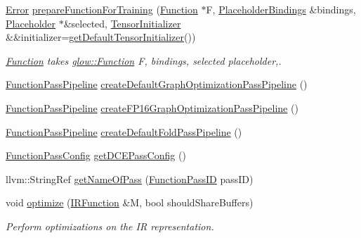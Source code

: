 \begin{DoxyCompactItemize}
\mbox{\label{namespaceglow_afab8032d084eac6febc76e522aec8564}} 
\hyperlink{namespaceglow_afdb176c3a672ef66db0ecfc19a8d39bf}{Error} \hyperlink{namespaceglow_afab8032d084eac6febc76e522aec8564}{prepare\+Function\+For\+Training} (\hyperlink{classglow_1_1_function}{Function} $\ast$F, \hyperlink{classglow_1_1_placeholder_bindings}{Placeholder\+Bindings} \&bindings, \hyperlink{classglow_1_1_placeholder}{Placeholder} $\ast$\&selected, \hyperlink{namespaceglow_a32fc0e338408955f80a23cc7e0c0c82e}{Tensor\+Initializer} \&\&initializer=\hyperlink{namespaceglow_a4919335ab33be32c994fc590a146f819}{get\+Default\+Tensor\+Initializer}())
\begin{DoxyCompactList}\small\item\em \hyperlink{classglow_1_1_function}{Function} takes \hyperlink{classglow_1_1_function}{glow\+::\+Function} {\ttfamily F}, {\ttfamily bindings}, {\ttfamily selected} placeholder,. \end{DoxyCompactList}\item 
\hyperlink{classglow_1_1_function_pass_pipeline}{Function\+Pass\+Pipeline} \hyperlink{namespaceglow_afd7544cbea4219b8f3c720d6a4e19481}{create\+Default\+Graph\+Optimization\+Pass\+Pipeline} ()
\item 
\hyperlink{classglow_1_1_function_pass_pipeline}{Function\+Pass\+Pipeline} \hyperlink{namespaceglow_a2cba8b151906d972e63ced04b7e02242}{create\+F\+P16\+Graph\+Optimization\+Pass\+Pipeline} ()
\item 
\hyperlink{classglow_1_1_function_pass_pipeline}{Function\+Pass\+Pipeline} \hyperlink{namespaceglow_a9e0b594543fb42b8b6ad0cc556ee9829}{create\+Default\+Fold\+Pass\+Pipeline} ()
\item 
\hyperlink{classglow_1_1_function_pass_config}{Function\+Pass\+Config} \hyperlink{namespaceglow_a4fef74193703ceb204297b6993af8081}{get\+D\+C\+E\+Pass\+Config} ()
\item 
llvm\+::\+String\+Ref \hyperlink{namespaceglow_a6195ce22fbeafd894c0ce148bb7a8a9a}{get\+Name\+Of\+Pass} (\hyperlink{namespaceglow_a3157945b92abd634c79fa9d4724472eb}{Function\+Pass\+ID} pass\+ID)
\item 
\mbox{\label{namespaceglow_ac26012881301f2ecb24de4db2c87acf1}} 
void \hyperlink{namespaceglow_ac26012881301f2ecb24de4db2c87acf1}{optimize} (\hyperlink{classglow_1_1_i_r_function}{I\+R\+Function} \&M, bool should\+Share\+Buffers)
\begin{DoxyCompactList}\small\item\em Perform optimizations on the IR representation. \end{DoxyCompactList}\item 

\end{DoxyCompactItemize}
